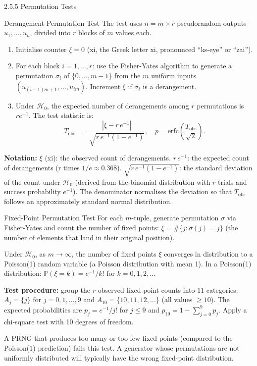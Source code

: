 \documentclass[aspectratio=169,10pt]{beamer}
\begin{document}
\begin{frame}[allowframebreaks]{2.5.5 Permutation Tests}
\framebreak

\begin{block}{Derangement Permutation Test}
The test uses $n = m \times r$ pseudorandom outputs $u_1, \ldots, u_n$,
divided into $r$ blocks of $m$ values each.
\begin{enumerate}
  \item Initialise counter $\xi = 0$ (xi, the Greek letter xi, pronounced
    ``ks-eye'' or ``zai'').
  \item For each block $i = 1, \ldots, r$: use the Fisher-Yates algorithm
    to generate a permutation $\sigma_i$ of $\{0, \ldots, m-1\}$ from
    the $m$ uniform inputs $(u_{(i-1)m+1}, \ldots, u_{im})$.  Increment
    $\xi$ if $\sigma_i$ is a derangement.
  \item Under $\mathcal{H}_0$, the expected number of derangements among
    $r$ permutations is $r e^{-1}$.  The test statistic is:
    \[
      T_{\mathrm{obs}}
      \;=\; \frac{|\xi - r\,e^{-1}|}{\sqrt{r\,e^{-1}(1 - e^{-1})}},
      \quad p = \mathrm{erfc}\!\left(\frac{T_{\mathrm{obs}}}{\sqrt{2}}\right).
    \]
\end{enumerate}

\textbf{Notation:}
$\xi$ (xi): the observed count of derangements.
$r\,e^{-1}$: the expected count of derangements (r times $1/e \approx 0.368$).
$\sqrt{r\,e^{-1}(1-e^{-1})}$: the standard deviation of the count under
$\mathcal{H}_0$ (derived from the binomial distribution with $r$ trials and
success probability $e^{-1}$).  The denominator normalises the deviation so
that $T_{\mathrm{obs}}$ follows an approximately standard normal distribution.
\end{block}

\begin{block}{Fixed-Point Permutation Test}
For each $m$-tuple, generate permutation $\sigma$ via Fisher-Yates and count
the number of fixed points: $\xi = \#\{j : \sigma(j) = j\}$ (the number
of elements that land in their original position).

Under $\mathcal{H}_0$, as $m \to \infty$, the number of fixed points $\xi$
converges in distribution to a Poisson(1) random variable (a Poisson
distribution with mean 1).  In a Poisson(1) distribution:
$\mathbb{P}(\xi = k) = e^{-1}/k!$ for $k = 0, 1, 2, \ldots$

\textbf{Test procedure:} group the $r$ observed fixed-point counts into
11 categories: $A_j = \{j\}$ for $j = 0, 1, \ldots, 9$ and
$A_{10} = \{10, 11, 12, \ldots\}$ (all values $\ge 10$).  The expected
probabilities are $p_j = e^{-1}/j!$ for $j \le 9$ and
$p_{10} = 1 - \sum_{j=0}^9 p_j$.  Apply a chi-square test with 10 degrees
of freedom.

A PRNG that produces too many or too few fixed points (compared to the
Poisson(1) prediction) fails this test.  A generator whose permutations
are not uniformly distributed will typically have the wrong fixed-point
distribution.
\end{block}

\end{frame}
\end{document}
